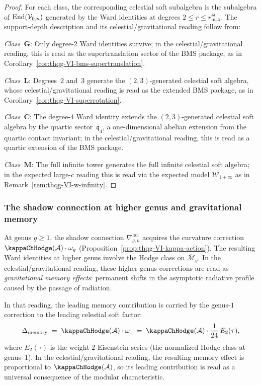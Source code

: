 \begin{proof}
For each class, the corresponding celestial soft subalgebra is the
subalgebra
of $\operatorname{End}(\mathcal{V}_{0,n})$ generated by the Ward identities at degrees
\(2\le r\le r^\Theta_{\max}\). The support-depth description and its
celestial/gravitational reading follow from:

\emph{Class~$\mathbf{G}$}: Only degree-$2$ Ward identities
survive; in the celestial/gravitational reading, this is read as the
supertranslation sector of the BMS package, as in
Corollary~\ref{cor:thqg-VI-bms-supertranslation}.

\emph{Class~$\mathbf{L}$}: Degrees~$2$ and~$3$ generate
the $(2,3)$-generated celestial soft algebra, whose
celestial/gravitational reading is read as the extended
BMS package, as in
Corollary~\ref{cor:thqg-VI-superrotation}.

\emph{Class~$\mathbf{C}$}: The degree-$4$ Ward identity extends
the $(2,3)$-generated celestial soft algebra by the quartic
sector~$\mathfrak{q}_4$, a one-dimensional abelian extension from
the quartic contact invariant; in the celestial/gravitational
reading, this is read as a quartic extension of the BMS package.

\emph{Class~$\mathbf{M}$}: The full infinite tower generates
the full infinite celestial soft algebra; in the expected large-$c$
reading this is read via the expected model $\mathcal{W}_{1+\infty}$ as in
Remark~\ref{rem:thqg-VI-w-infinity}.
\end{proof}

\subsubsection{The shadow connection at higher genus and
gravitational memory}

\begin{remark}
At genus $g \geq 1$, the shadow connection
$\nabla^{\mathrm{hol}}_{g,n}$ acquires the curvature correction
$\kappaChHodge(\cA) \cdot \omega_g$
(Proposition~\ref{prop:thqg-VI-kappa-action}). The resulting
Ward identities at higher genus involve the Hodge class on
$\overline{\mathcal{M}}_g$. In the celestial/gravitational reading,
these higher-genus corrections are read as \emph{gravitational memory
effects}: permanent shifts in the asymptotic radiative profile caused
by the passage of radiation.

In that reading, the leading memory contribution is carried by the
genus-$1$ correction to the leading celestial soft factor:
\begin{equation}%
\Delta_{\mathrm{memory}}
\;=\;
\kappaChHodge(\cA) \cdot \omega_1
\;=\;
\kappaChHodge(\cA) \cdot \frac{1}{24}\,E_2(\tau),
\end{equation}
where $E_2(\tau)$ is the weight-$2$ Eisenstein series (the
normalized Hodge class at genus~$1$). In the
celestial/gravitational reading, the resulting memory effect is
proportional to $\kappaChHodge(\cA)$, so its leading contribution is
read as a universal consequence of the modular characteristic.
\end{remark}

